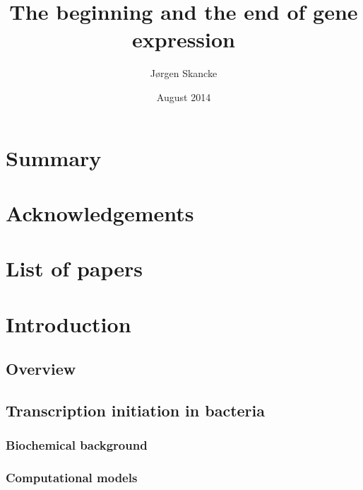\documentclass[]{ntnuthesis}
\title{The beginning and the end of gene expression}
\author{Jørgen Skancke}
\date{August 2014}
\begin{document}
 

\frontmatter

\maketitle

\chapter*{Summary}
\noindent
    
\clearpage


\chapter*{Acknowledgements}

\chapter*{List of papers}


\tableofcontents
\listoffigures
\listoftables

\setcounter{chapter}{1}
\mainmatter
\chapter{Introduction}
\begin{refsection}
\section{Overview}

\FloatBarrier


\section{Transcription initiation in bacteria}

\subsection{Biochemical background}

\subsection{Computational models}

\printbibliography
\end{refsection}
\newpage
\end{document}
